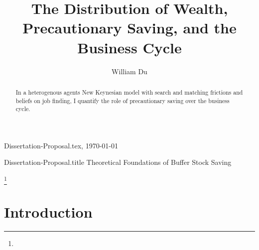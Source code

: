 \documentclass[titlepage]{\econtex}\providecommand{\texname}{Dissertation-Proposal}
\providecommand{\onlyinsubfile}{}
\providecommand{\notinsubfile}{}
\renewcommand{\onlyinsubfile}[1]{}
\renewcommand{\notinsubfile}[1]{#1}
\begin{document}

\renewcommand{\onlyinsubfile}[1]{}\renewcommand{\notinsubfile}[1]{#1} 

\hfill{\tiny \texname.tex, \today}

\begin{verbatimwrite}{\texname.title}
Theoretical Foundations of Buffer Stock Saving
\end{verbatimwrite}


\title{ The Distribution of Wealth, Precautionary Saving, and the Business Cycle}

\author{William Du\authNum}







\maketitle 


\hypertarget{abstract}{}
\begin{abstract}
In a heterogenous agents New Keynesian model with search and matching frictions and beliefs on job finding, I quantify the role of precautionary saving over the business cycle.

\end{abstract}


\begin{authorsinfo}
\end{authorsinfo}

\thanks{ }

\titlepagefinish


\newtheorem{defn}{Definition}
\newtheorem{theorem}{Theorem}

\hypertarget{Introduction}{}
\section{Introduction}

\label{sec:intro}


\end{document}

